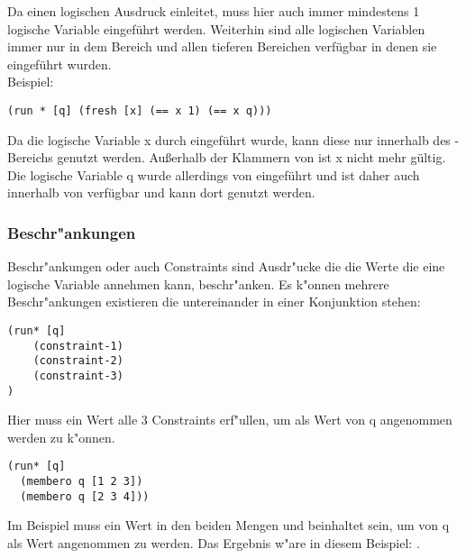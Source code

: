 Da  einen logischen Ausdruck einleitet, muss hier auch immer mindestens 1 logische Variable eingeführt werden. Weiterhin sind alle logischen Variablen immer nur in dem Bereich und allen tieferen Bereichen verfügbar in denen sie eingeführt wurden.\\
Beispiel:
\begin{lstlisting}
(run * [q] (fresh [x] (== x 1) (== x q)))
\end{lstlisting}
Da die logische Variable x durch  eingeführt wurde, kann diese nur innerhalb des -Bereichs genutzt werden. Außerhalb der Klammern von  ist x nicht mehr gültig. Die logische Variable q wurde allerdings von   eingeführt und ist daher auch innerhalb von  verfügbar und kann dort genutzt werden.


\subsubsection{Beschr"ankungen}

Beschr"ankungen oder auch Constraints sind Ausdr"ucke die die Werte die eine logische Variable annehmen kann, beschr"anken. Es k"onnen mehrere Beschr"ankungen existieren die untereinander in einer Konjunktion stehen:
\begin{lstlisting}
(run* [q]
    (constraint-1)
    (constraint-2)
    (constraint-3)
)
\end{lstlisting}

Hier muss ein Wert alle 3 Constraints erf"ullen, um als Wert von q angenommen werden zu k"onnen.
\begin{lstlisting}
(run* [q]
  (membero q [1 2 3])
  (membero q [2 3 4]))
\end{lstlisting}

Im Beispiel muss ein Wert in den beiden Mengen \code{[1 2 3]} und \code{[2 3 4]} beinhaltet sein, um von q als Wert angenommen zu werden. Das Ergebnis w"are in diesem Beispiel: \code{[2 3]}.


